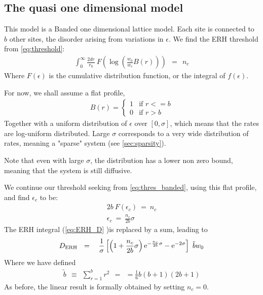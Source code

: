 \subsection{The quasi one dimensional model}\label{sec:quasi_oned}

This model is a Banded one dimensional lattice model. Each site 
is connected to $b$ other sites, the disorder arising from
variations in $\epsilon$. 
We find the ERH threshold from \autoref{eq:threshold}:
%
\begin{align}\label{eq:thres_banded}
\int_0^{\infty}  
\frac{2 dr}{r_0} 
\ F\left(\log\left(\frac{w_0}{w_c}B(r)\right)\right) 
\ \ = \ \ n_c
\end{align}
%
Where $F(\epsilon)$ is the cumulative distribution function, or the integral of $f(\epsilon)$.


For now, we shall assume a flat profile,
%
\begin{align}
B(r) = \begin{cases}
1 & \text{if } r <= b \\
0 & \text{if } r>b
\end{cases}
\end{align}
%
Together with a uniform distribution of $\epsilon$ over $[0,\sigma]$, which means that the rates are log-uniform distributed. Large $\sigma$ corresponds 
to a very wide distribution of rates, meaning a "sparse" system (see 
\autoref{sec:sparsity}).

Note that even with large $\sigma$, the distribution has a lower non zero bound, meaning that the system is still diffusive.


We continue our threshold seeking from \autoref{eq:thres_banded}, using this 
flat profile, and find $\epsilon_c$ to be:
%
\begin{align}
2b\ F(\epsilon_c) \ =\ n_c \\
\epsilon_c\ = \ \frac{n_c}{2b}\sigma
\end{align}
%
The ERH integral (\autoref{eq:ERH_D} )is replaced by a sum, leading to
\begin{align}
D_{\text{ERH}} \ \ = \ \ 
\ \frac{1}{\sigma}\left[ 
\left(1+\frac{n_c}{2b}\sigma\right)\eexp{-\frac{n_c}{2b}\sigma} - \eexp{-2\sigma}
\right] \ \tilde{b} w_0
\end{align}
Where we have defined
%
\begin{align}
\tilde{b} \ \ \equiv \ \ \sum_{r=1}^b r^2 \ \ = \ \ = \frac{1}{6}b(b+1)(2b+1)
\end{align}
%
As before, the linear result is formally obtained by setting $n_c=0$.

